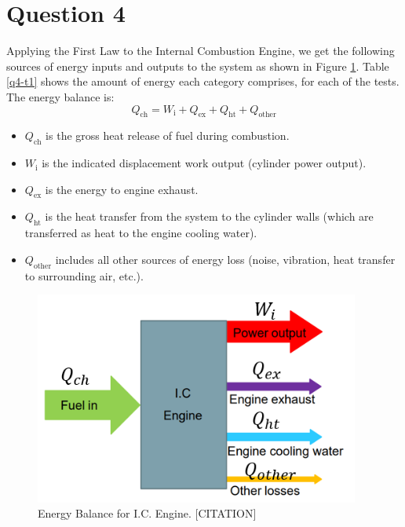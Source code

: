 \documentclass[11pt]{article}
\begin{document}
\section{Question 4}
Applying the First Law to the Internal Combustion Engine, we get the following sources of energy inputs and outputs to the system as shown in Figure \ref{q4-f1}. Table \ref{q4-t1} shows the amount of energy each category comprises, for each of the tests. The energy balance is:
\begin{equation}
	Q_\textrm{ch} = W_\textrm{i} + Q_\textrm{ex} + Q_\textrm{ht} + Q_\textrm{other}\label{q4-1}
\end{equation}
\begin{itemize}
	\item $Q_\textrm{ch}$ is the gross heat release of fuel during combustion.
	\item $W_\textrm{i}$ is the indicated displacement work output (cylinder power output).
	\item $Q_\textrm{ex}$ is the energy to engine exhaust.
	\item $Q_\textrm{ht}$ is the heat transfer from the system to the cylinder walls (which are transferred as heat to the engine cooling water).
	\item $Q_\textrm{other}$ includes all other sources of energy loss (noise, vibration, heat transfer to surrounding air, etc.).
\end{itemize}
\begin{figure}[H]
	\centering
    \includegraphics[height = 7cm]{./img/diagram16.png}
    \caption{Energy Balance for I.C. Engine. [CITATION]}
    \label{q4-f1}
\end{figure}
\end{document}
